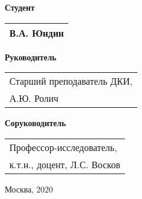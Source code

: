 \begin{multicols}{2}
    \noindent
    \textbf{Студент}
    
    \vspace{10.5mm}
    
    \noindent
    \begin{tabularx}{\linewidth}{l}
        В.А. Юндин \\
        \hline
    \end{tabularx}
    
    \columnbreak
    
    \noindent
    \textbf{Руководитель}
    
    \vspace{4mm}
    
    \noindent %
    \begin{tabularx}{\linewidth}{l}
        Старший преподаватель ДКИ,\\А.Ю. Ролич\\
        \hline
    \end{tabularx}

    \vspace{8mm}

    \noindent
    \textbf{Соруководитель}
    
    \vspace{4mm}
    
    \noindent %
    \begin{tabularx}{\linewidth}{l}
        Профессор-исследователь,\\к.т.н., доцент, Л.С. Восков\\
        \hline
    \end{tabularx}
\end{multicols}

\vfill
\begin{center}Москва, 2020\end{center}

\restoregeometry
\newpage
